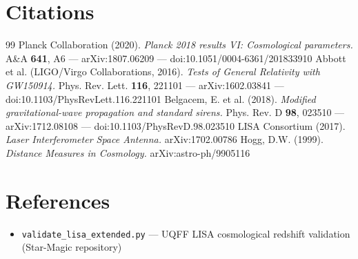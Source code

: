 \documentclass[12pt,a4paper]{article}
\begin{document}
\section*{Citations}
\begin{thebibliography}{99}
 Planck Collaboration (2020). \emph{Planck 2018 results VI: Cosmological parameters.} A\&A \textbf{641}, A6 --- arXiv:1807.06209 --- doi:10.1051/0004-6361/201833910
 Abbott et al. (LIGO/Virgo Collaborations, 2016). \emph{Tests of General Relativity with GW150914.} Phys. Rev. Lett. \textbf{116}, 221101 --- arXiv:1602.03841 --- doi:10.1103/PhysRevLett.116.221101
 Belgacem, E. et al. (2018). \emph{Modified gravitational-wave propagation and standard sirens.} Phys. Rev. D \textbf{98}, 023510 --- arXiv:1712.08108 --- doi:10.1103/PhysRevD.98.023510
 LISA Consortium (2017). \emph{Laser Interferometer Space Antenna.} arXiv:1702.00786
 Hogg, D.W. (1999). \emph{Distance Measures in Cosmology.} arXiv:astro-ph/9905116
\end{thebibliography}

\section*{References}
\begin{itemize}
  \item[6.] \texttt{validate\_lisa\_extended.py} --- UQFF LISA cosmological redshift validation (Star-Magic repository)
\end{itemize}

\end{document}
